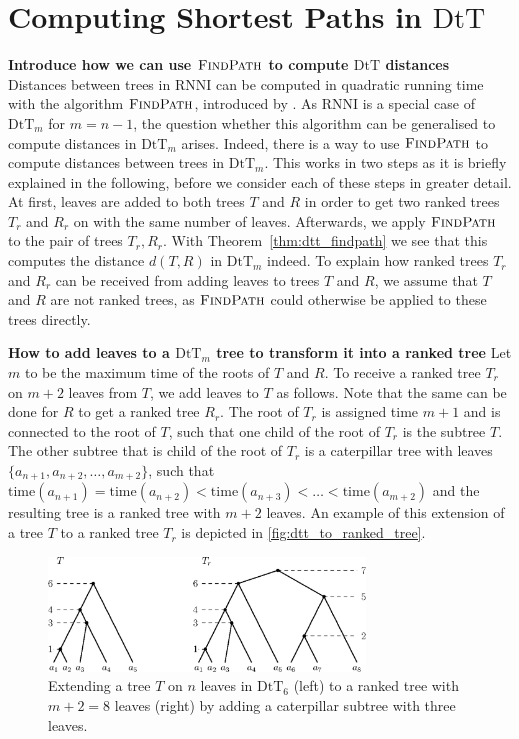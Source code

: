 \documentclass[11pt]{amsart}
\newcommand{\rnni}{\mathrm{RNNI}}
\newcommand{\findpath}{\textsc{FindPath}}
\newcommand{\ntime}{\mathrm{time}}
\newcommand{\dtt}{\mathrm{DtT}}
\newcommand{\summary}[1]{\textbf{#1}} %
\begin{document}
\section{Computing Shortest Paths in $\dtt$}

\todo{Do we want $\dtt$ or $\dtt_m$ in the titles of sections?}

\summary{Introduce how we can use $\findpath$ to compute $\dtt$ distances}
Distances between trees in $\rnni$ can be computed in quadratic running time with the algorithm $\findpath$, introduced by \textcite{Collienne2020-iu}.
As $\rnni$ is a special case of $\dtt_m$ for $m = n-1$, the question whether this algorithm can be generalised to compute distances in $\dtt_m$ arises.
Indeed, there is a way to use $\findpath$ to compute distances between trees in $\dtt_m$.
This works in two steps as it is briefly explained in the following, before we consider each of these steps in greater detail.
At first, leaves are added to both trees $T$ and $R$ in order to get two ranked trees $T_r$ and $R_r$ on with the same number of leaves.
Afterwards, we apply $\findpath$ to the pair of trees $T_r,R_r$.
With Theorem~\ref{thm:dtt_findpath} we see that this computes the distance $d(T,R)$ in $\dtt_m$ indeed.
To explain how ranked trees $T_r$ and $R_r$ can be received from adding leaves to trees $T$ and $R$, we assume that $T$ and $R$ are not ranked trees, as $\findpath$ could otherwise be applied to these trees directly.

\summary{How to add leaves to a $\dtt_m$ tree to transform it into a ranked tree}
Let $m$ to be the maximum time of the roots of $T$ and $R$.
To receive a ranked tree $T_r$ on $m+2$ leaves from $T$, we add leaves to $T$ as follows.
Note that the same can be done for $R$ to get a ranked tree $R_r$.
The root of $T_r$ is assigned time $m + 1$ and is connected to the root of $T$, such that one child of the root of $T_r$ is the subtree $T$.
The other subtree that is child of the root of $T_r$ is a caterpillar tree with leaves $\{a_{n+1}, a_{n+2}, \ldots, a_{m+2}\}$, such that $\ntime(a_{n+1}) = \ntime(a_{n+2}) < \ntime(a_{n+3}) < \ldots < \ntime(a_{m+2})$ and the resulting tree is a ranked tree with $m+2$ leaves.
An example of this extension of a tree $T$ to a ranked tree $T_r$ is depicted in \autoref{fig:dtt_to_ranked_tree}.

\begin{figure}[ht]
	\includegraphics[width=0.75\textwidth]{dtt_to_ranked_tree.eps}
	\caption{Extending a tree $T$ on $n$ leaves in $\dtt_6$ (left) to a ranked tree with $m+2=8$ leaves (right) by adding a caterpillar subtree with three leaves.}
	\label{fig:dtt_to_ranked_tree}
\end{figure}
\end{document}

